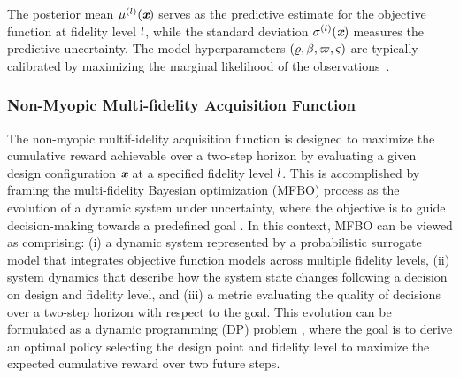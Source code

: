 The posterior mean $\mu^{(l)}(\textbf{\em x})$ serves as the predictive estimate for the objective function at fidelity level $l$, while the standard deviation $\sigma^{(l)}(\textbf{\em x})$ measures the predictive uncertainty. The model hyperparameters $(\varrho, \beta, \varpi, \varsigma)$ are typically calibrated by maximizing the marginal likelihood of the observations~\cite{ForresterAl2008}.

\subsubsection{Non-Myopic Multi-fidelity Acquisition Function}
\label{s:NMAF}

The non-myopic multif-idelity acquisition function is designed to maximize the cumulative reward achievable over a two-step horizon by evaluating a given design configuration \(\textbf{\em x}\) at a specified fidelity level \(l\). This is accomplished by framing the multi-fidelity Bayesian optimization (MFBO) process as the evolution of a dynamic system under uncertainty, where the objective is to guide decision-making towards a predefined goal \cite{DiFioreMaininiNM2BO}. In this context, MFBO can be viewed as comprising: (i) a dynamic system represented by a probabilistic surrogate model that integrates objective function models across multiple fidelity levels, (ii) system dynamics that describe how the system state changes following a decision on design and fidelity level, and (iii) a metric evaluating the quality of decisions over a two-step horizon with respect to the goal.
%
This evolution can be formulated as a dynamic programming (DP) problem \cite{Bertsekas1995, Powell2007}, where the goal is to derive an optimal policy selecting the design point and fidelity level to maximize the expected cumulative reward over two future steps.

